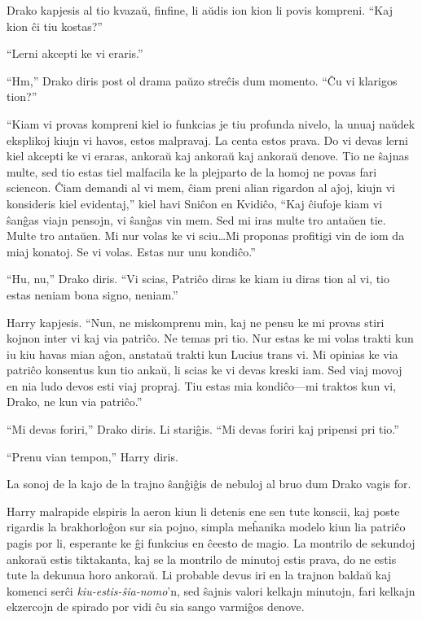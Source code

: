Drako kapjesis al tio kvazaŭ, finfine, li aŭdis ion kion li povis
kompreni. ``Kaj kion ĉi tiu kostas?''

``Lerni akcepti ke vi eraris.''

``Hm,'' Drako diris post ol drama paŭzo streĉis dum momento. ``Ĉu vi
klarigos tion?''

``Kiam vi provas kompreni kiel io funkcias je tiu profunda nivelo, la unuaj
naŭdek eksplikoj kiujn vi havos, estos malpravaj. La centa estos
prava. Do vi devas lerni kiel akcepti ke vi eraras, ankoraŭ kaj
ankoraŭ kaj ankoraŭ denove. Tio ne ŝajnas multe, sed tio estas tiel
malfacila ke la plejparto de la homoj ne povas fari sciencon. Ĉiam
demandi al vi mem, ĉiam preni alian rigardon al aĵoj, kiujn vi
konsideris kiel evidentaj,'' kiel havi Sniĉon en Kvidiĉo, ``Kaj
ĉiufoje kiam vi ŝanĝas viajn pensojn, vi ŝanĝas vin mem. Sed mi iras
multe tro antaŭen tie. Multe tro antaŭen. Mi nur volas ke vi
sciu\ldots Mi proponas profitigi vin de iom da miaj konatoj. Se vi
volas. Estas nur unu kondiĉo.''

``Hu, nu,'' Drako diris. ``Vi scias, Patriĉo diras ke kiam iu diras
tion al vi, tio estas neniam bona signo, neniam.''

Harry kapjesis. ``Nun, ne miskomprenu min, kaj ne pensu ke mi provas
stiri kojnon inter vi kaj via patriĉo. Ne temas pri tio. Nur estas ke
mi volas trakti kun iu kiu havas mian aĝon, anstataŭ trakti kun Lucius
trans vi. Mi opinias ke via patriĉo konsentus kun tio ankaŭ, li scias ke
vi devas kreski iam. Sed viaj movoj en nia ludo devos esti viaj
propraj. Tiu estas mia kondiĉo—mi traktos kun vi, Drako, ne kun via
patriĉo.''


``Mi devas foriri,'' Drako diris. Li stariĝis. ``Mi devas foriri kaj
pripensi pri tio.''

``Prenu vian tempon,'' Harry diris.

La sonoj de la kajo de la trajno ŝanĝiĝis de nebuloj al bruo dum Drako
vagis for.

Harry malrapide elspiris la aeron kiun li detenis ene sen tute
konscii, kaj poste rigardis la brakhorloĝon sur sia pojno, simpla
meĥanika modelo kiun lia patriĉo pagis por li, esperante ke ĝi
funkcius en ĉeesto de magio. La montrilo de sekundoj ankoraŭ estis
tiktakanta, kaj se la montrilo de minutoj estis prava, do ne estis
tute la dekunua horo ankoraŭ. Li probable devus iri en la trajnon
baldaŭ kaj komenci serĉi \emph{kiu-estis-ŝia-nomo}'n, sed ŝajnis
valori kelkajn minutojn, fari kelkajn ekzercojn de spirado por vidi ĉu
sia sango varmiĝos denove.


